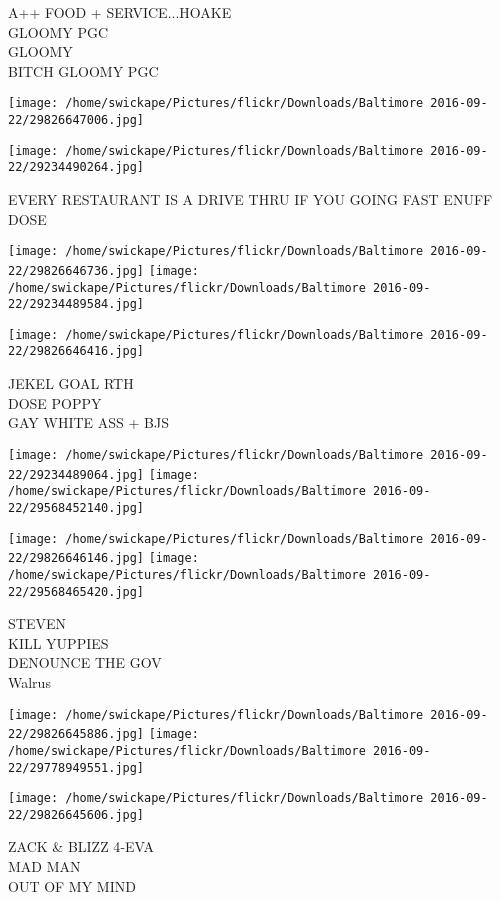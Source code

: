 \documentclass[10pt,letterpaper]{article}
\begin{document}
A++ FOOD + SERVICE...HOAKE\\
GLOOMY PGC\\
GLOOMY\\
BITCH GLOOMY PGC
\pagebreak

\texttt{[image: /home/swickape/Pictures/flickr/Downloads/Baltimore 2016-09-22/29826647006.jpg]}

\vspace{0.25in}
\texttt{[image: /home/swickape/Pictures/flickr/Downloads/Baltimore 2016-09-22/29234490264.jpg]}

EVERY RESTAURANT IS A DRIVE THRU IF YOU GOING FAST ENUFF\\
DOSE
\pagebreak

\texttt{[image: /home/swickape/Pictures/flickr/Downloads/Baltimore 2016-09-22/29826646736.jpg]}
\texttt{[image: /home/swickape/Pictures/flickr/Downloads/Baltimore 2016-09-22/29234489584.jpg]}

\vspace{0.25in}
\texttt{[image: /home/swickape/Pictures/flickr/Downloads/Baltimore 2016-09-22/29826646416.jpg]}

JEKEL GOAL RTH\\
DOSE POPPY\\
GAY WHITE ASS + BJS
\pagebreak

\texttt{[image: /home/swickape/Pictures/flickr/Downloads/Baltimore 2016-09-22/29234489064.jpg]}
\texttt{[image: /home/swickape/Pictures/flickr/Downloads/Baltimore 2016-09-22/29568452140.jpg]}

\texttt{[image: /home/swickape/Pictures/flickr/Downloads/Baltimore 2016-09-22/29826646146.jpg]}
\texttt{[image: /home/swickape/Pictures/flickr/Downloads/Baltimore 2016-09-22/29568465420.jpg]}

STEVEN\\
KILL YUPPIES\\
DENOUNCE THE GOV\\
Walrus
\pagebreak

\texttt{[image: /home/swickape/Pictures/flickr/Downloads/Baltimore 2016-09-22/29826645886.jpg]}
\texttt{[image: /home/swickape/Pictures/flickr/Downloads/Baltimore 2016-09-22/29778949551.jpg]}

\texttt{[image: /home/swickape/Pictures/flickr/Downloads/Baltimore 2016-09-22/29826645606.jpg]}

ZACK \& BLIZZ 4{-}EVA\\
MAD MAN\\
OUT OF MY MIND
\pagebreak
\end{document}
